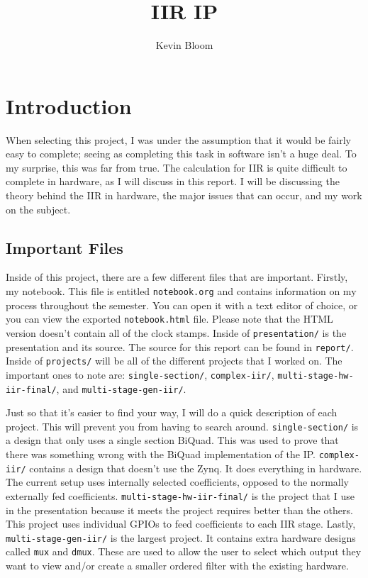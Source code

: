 \documentclass[12pt,a4paper,titlepage]{article}
\begin{document}
\title{IIR IP}
\author{Kevin Bloom}
\maketitle

\newpage

\tableofcontents

\newpage

\section{Introduction}
When selecting this project, I was under the assumption that it would be fairly
easy to complete; seeing as completing this task in software isn't a huge
deal. To my surprise, this was far from true. The calculation for IIR is quite
difficult to complete in hardware, as I will discuss in this report. I will be
discussing the theory behind the IIR in hardware, the major issues that can
occur, and my work on the subject.

\subsection{Important Files}
Inside of this project, there are a few different files that are important.
Firstly, my notebook. This file is entitled \texttt{notebook.org} and contains
information on my process throughout the semester. You can open it with a text
editor of choice, or you can view the exported \texttt{notebook.html}
file. Please note that the HTML version doesn't contain all of the clock
stamps. Inside of \texttt{presentation/} is the presentation and its source. The
source for this report can be found in \texttt{report/}. Inside of
\texttt{projects/} will be all of the different projects that I worked on. The
important ones to note are: \texttt{single-section/},
\texttt{complex-iir/}, \texttt{multi-stage-hw-iir-final/}, and
\texttt{multi-stage-gen-iir/}.

Just so that it's easier to find your way, I will do a quick description of each
project. This will prevent you from having to search
around. \texttt{single-section/} is a design that only uses a single section
BiQuad. This was used to prove that there was something wrong with the BiQuad
implementation of the IP. \texttt{complex-iir/} contains a design that doesn't
use the Zynq. It does everything in hardware. The current setup uses internally
selected coefficients, opposed to the normally externally fed
coefficients. \texttt{multi-stage-hw-iir-final/} is the project that I use in
the presentation because it meets the project requires better than the
others. This project uses individual GPIOs to feed coefficients to each IIR
stage. Lastly, \texttt{multi-stage-gen-iir/} is the largest project. It contains
extra hardware designs called \texttt{mux} and \texttt{dmux}. These are used to
allow the user to select which output they want to view and/or create a smaller
ordered filter with the existing hardware.
\end{document}

